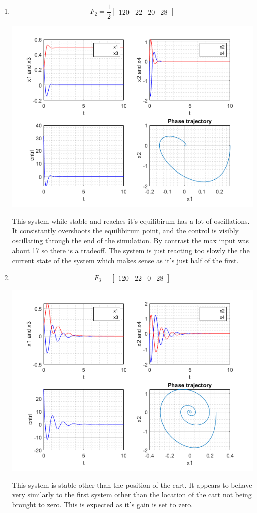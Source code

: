 \documentclass{article}
\begin{document}
\begin{enumerate}[1)]
\item $$ F_2 = \frac{1}{2}\begin{bmatrix} 120 & 22 & 20 & 28 \end{bmatrix} $$
\begin{minipage}{\linewidth}
\centering
\includegraphics[scale=.8]{images/p2-2.png}
\end{minipage}
This system while stable and reaches it's equilibirum has a lot of oscillations.
It consistantly overshoots the equilibirum point, and the control is visibly oscillating through the end of the simulation.
By contrast the max input was about 17 so there is a tradeoff.
The system is just reacting too slowly the the current state of the system which makes sense as it's just half of the first.

\newpage
\item $$ F_3 = \begin{bmatrix} 120 & 22 & 0 & 28 \end{bmatrix} $$
\begin{minipage}{\linewidth}
\centering
\includegraphics[scale=.8]{images/p2-3.png}
\end{minipage}
This system is stable other than the position of the cart.
It appears to behave very similarly to the first system other than the location of the cart not being brought to zero.
This is expected as it's gain is set to zero.


\end{enumerate}
\end{document}
